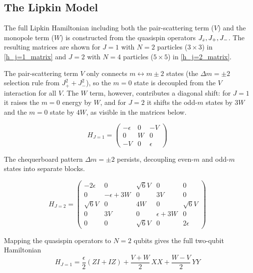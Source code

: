 \subsection{The Lipkin Model}
\label{subsec:lipkin-model}

The full Lipkin Hamiltonian including both the pair-scattering term ($V$) and the monopole term ($W$) is constructed from the quasispin operators $J_z,\space J_+,\space J_-$. The resulting matrices are shown for $J=1$ with $N=2$ particles ($3\times3$) in \cref{h_j=1_matrix} and $J=2$ with $N=4$ particles ($5\times5$) in \cref{h_j=2_matrix}.

The pair-scattering term $V$ only connects $m \leftrightarrow m\pm2$ states (the $\Delta m = \pm 2$ selection rule from $J_+^2+J_-^2$), so the $m=0$ state is decoupled from the $V$ interaction for all $V$. The $W$ term, however, contributes a diagonal shift: for $J=1$ it raises the $m=0$ energy by $W$, and for $J=2$ it shifts the odd-$m$ states by $3W$ and the $m=0$ state by $4W$, as visible in the matrices below.

\begin{equation}\label{h_j=1_matrix}
    H_{J=1} = \begin{pmatrix}
        -\epsilon & 0 & -V \\
        0 & W & 0 \\
        -V & 0 & \epsilon
    \end{pmatrix}
\end{equation}

The chequerboard pattern $\Delta m = \pm 2$ persists, decoupling even-$m$ and odd-$m$ states into separate blocks.

\begin{equation}\label{h_j=2_matrix}
    H_{J=2} = 
    \begin{pmatrix}
        -2\epsilon & 0 & \sqrt{6}V & 0 & 0 \\
        0 & -\epsilon + 3W & 0 & 3V & 0 \\
        \sqrt{6}V & 0 & 4W & 0 & \sqrt{6}V \\
        0 & 3V & 0 & \epsilon+3W & 0 \\
        0 & 0 & \sqrt{6}V & 0 & 2\epsilon
    \end{pmatrix}
\end{equation}

Mapping the quasispin operators to $N=2$ qubits gives the full two-qubit Hamiltonian
\begin{equation}
    H_{J=1}=\frac{\epsilon}{2}(ZI+IZ)+\frac{V+W}{2}\,XX+\frac{W-V}{2}\,YY
\end{equation}

